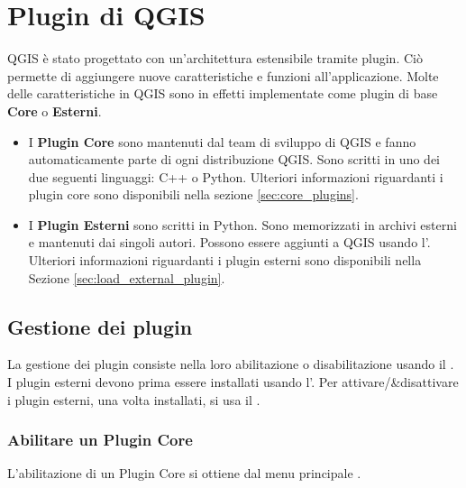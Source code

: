 
\chapter{Plugin di QGIS}\label{sec:plugins}


QGIS è stato progettato con un'architettura estensibile tramite plugin. 
Ciò permette di aggiungere nuove caratteristiche e funzioni
all'applicazione. Molte delle caratteristiche in QGIS sono in effetti implementate come plugin di
base \textbf{Core} o \textbf{Esterni}. 

\begin{itemize}[label=--]
\item I \textbf{Plugin Core} sono mantenuti dal team di sviluppo di QGIS e fanno automaticamente 
parte di ogni distribuzione QGIS.
Sono scritti in uno dei due seguenti linguaggi: C++ o Python.
Ulteriori informazioni riguardanti i plugin core sono disponibili nella sezione \ref{sec:core_plugins}.
\item I \textbf{Plugin Esterni} sono scritti in Python.
Sono memorizzati in archivi esterni e mantenuti dai singoli autori.
Possono essere aggiunti a QGIS usando l'.
Ulteriori informazioni riguardanti i plugin esterni sono disponibili nella Sezione \ref{sec:load_external_plugin}.
\end{itemize}

\section{Gestione dei plugin}\label{sec:managing_plugins}

La gestione dei plugin consiste nella loro abilitazione o disabilitazione usando il .
I plugin esterni devono prima essere installati usando l'.
Per attivare/&disattivare i plugin esterni, una volta installati, si usa il .

\subsection{Abilitare un Plugin Core}\label{sec:load_core_plugin} 

L'abilitazione di un Plugin Core si ottiene dal menu principale  \arrow 
{}.

